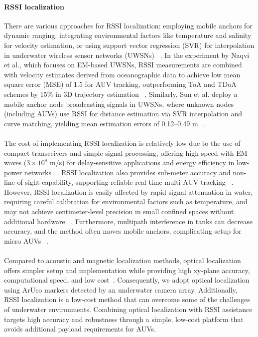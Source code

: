 \documentclass[11pt]{article}
\begin{document}
        \paragraph{RSSI localization}
        There are various approaches for RSSI localization: employing mobile anchors for dynamic ranging, integrating environmental factors like temperature and salinity for velocity estimation, or using support vector regression (SVR) for interpolation in underwater wireless sensor networks (UWSNs) ~\cite{naqvi2025rssi,sun2019mobile}. In the experiment by Naqvi et al., which focuses on EM-based UWSNs, RSSI measurements are combined with velocity estimates derived from oceanographic data to achieve low mean square error (MSE) of 1.5 for AUV tracking, outperforming ToA and TDoA schemes by $15\%$ in 3D trajectory estimation ~\cite{naqvi2025rssi}. Similarly, Sun et al. deploy a mobile anchor node broadcasting signals in UWSNs, where unknown nodes (including AUVs) use RSSI for distance estimation via SVR interpolation and curve matching, yielding mean estimation errors of 0.12–0.49 m ~\cite{sun2019mobile}.\\\\
        The cost of implementing RSSI localization is relatively low due to the use of compact transceivers and simple signal processing, offering high speed with EM waves ($3×10^8$ m/s) for delay-sensitive applications and energy efficiency in low-power networks ~\cite{naqvi2025rssi,sun2019mobile}. RSSI localization also provides sub-meter accuracy and non-line-of-sight capability, supporting reliable real-time multi-AUV tracking ~\cite{sun2019mobile}. However, RSSI localization is easily affected by rapid signal attenuation in water, requiring careful calibration for environmental factors such as temperature, and may not achieve centimeter-level precision in small confined spaces without additional hardware ~\cite{naqvi2025rssi,sun2019mobile}. Furthermore, multipath interference in tanks can decrease accuracy, and the method often moves mobile anchors, complicating setup for micro AUVs ~\cite{naqvi2025rssi}.\\\\
        Compared to acoustic and magnetic localization methods, optical localization offers simpler setup and implementation while providing high xy-plane accuracy, computational speed, and low cost~\cite{cai_development_2024}. Consequently, we adopt optical localization using ArUco markers detected by an underwater camera array. Additionally, RSSI localization is a low-cost method that can overcome some of the challenges of underwater environments. Combining optical localization with RSSI assistance targets high accuracy and robustness through a simple, low-cost platform that avoids additional payload requirements for AUVs.
        
\end{document}
